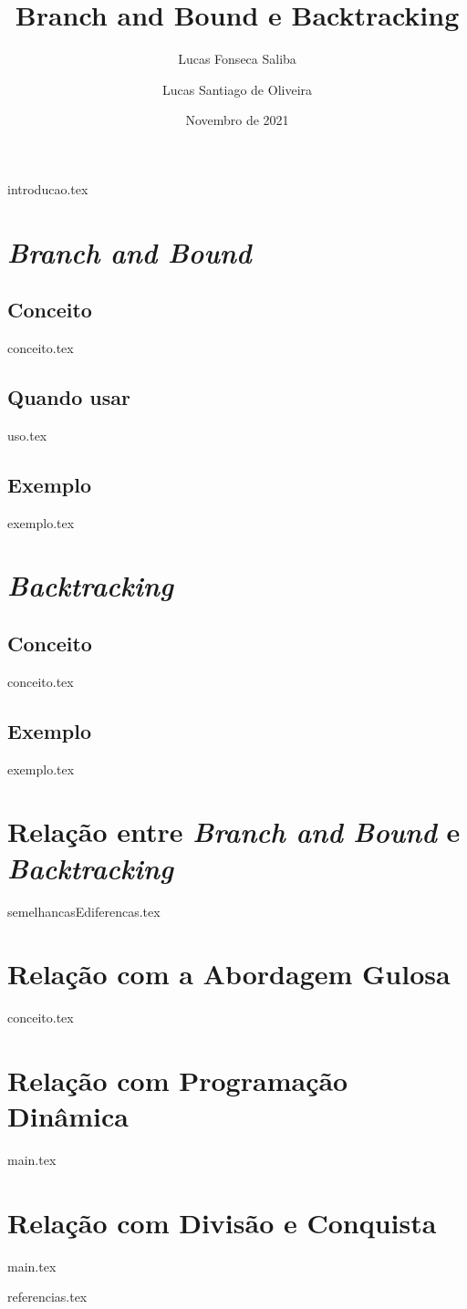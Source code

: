 \documentclass{article}
\title{Branch and Bound e Backtracking}
\author{Lucas Fonseca Saliba \and Lucas Santiago de Oliveira}
\date{Novembro de 2021}
\begin{document}
\maketitle
\vspace{1cm}
\tableofcontents
\newpage

{introducao.tex}

\section{\emph{Branch and Bound}}
\subsection{Conceito}
{conceito.tex}

\subsection{Quando usar}
{uso.tex}

\subsection{Exemplo}
{exemplo.tex}

\section{\emph{Backtracking}}
\subsection{Conceito}
{conceito.tex}

\subsection{Exemplo}
{exemplo.tex}

\section{Relação entre \emph{Branch and Bound} e \emph{Backtracking}}
{semelhancasEdiferencas.tex}

\section{Relação com a Abordagem Gulosa}
{conceito.tex}

\section{Relação com Programação Dinâmica}
{main.tex}

\section{Relação com Divisão e Conquista}
{main.tex}

{referencias.tex}
\end{document}
